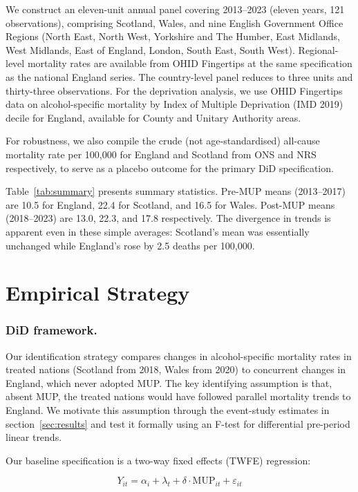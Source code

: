 \documentclass[12pt]{article}
\begin{document}
We construct an eleven-unit annual panel covering 2013--2023 (eleven years, 121 observations), comprising Scotland, Wales, and nine English Government Office Regions (North East, North West, Yorkshire and The Humber, East Midlands, West Midlands, East of England, London, South East, South West). Regional-level mortality rates are available from OHID Fingertips at the same specification as the national England series. The country-level panel reduces to three units and thirty-three observations. For the deprivation analysis, we use OHID Fingertips data on alcohol-specific mortality by Index of Multiple Deprivation (IMD 2019) decile for England, available for County and Unitary Authority areas.

For robustness, we also compile the crude (not age-standardised) all-cause mortality rate per 100,000 for England and Scotland from ONS and NRS respectively, to serve as a placebo outcome for the primary DiD specification.

Table~\ref{tab:summary} presents summary statistics. Pre-MUP means (2013--2017) are 10.5 for England, 22.4 for Scotland, and 16.5 for Wales. Post-MUP means (2018--2023) are 13.0, 22.3, and 17.8 respectively. The divergence in trends is apparent even in these simple averages: Scotland's mean was essentially unchanged while England's rose by 2.5 deaths per 100,000.



\section{Empirical Strategy}
\label{sec:strategy}

\subsubsection*{DiD framework.} Our identification strategy compares changes in alcohol-specific mortality rates in treated nations (Scotland from 2018, Wales from 2020) to concurrent changes in England, which never adopted MUP. The key identifying assumption is that, absent MUP, the treated nations would have followed parallel mortality trends to England. We motivate this assumption through the event-study estimates in section~\ref{sec:results} and test it formally using an F-test for differential pre-period linear trends.

Our baseline specification is a two-way fixed effects (TWFE) regression:

\begin{equation}
Y_{it} = \alpha_i + \lambda_t + \delta \cdot \text{MUP}_{it} + \varepsilon_{it}
\label{eq:twfe}
\end{equation}
\end{document}
